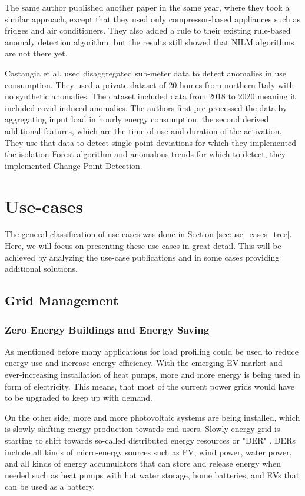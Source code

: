 The same author published another paper \cite{NILMAD22019} in the same year, where they took a similar approach, except that they used 
only compressor-based appliances such as fridges and air conditioners. They also added a rule to their existing rule-based anomaly 
detection algorithm, but the results still showed that NILM algorithms are not there yet. 

Castangia et al.\cite{Castangia2021} used disaggregated sub-meter data to detect anomalies in use consumption.
They used a private dataset of 20 homes from northern Italy with no synthetic anomalies. 
The dataset included data from 2018 to 2020 meaning it included covid-induced anomalies. 
The authors first pre-processed the data by aggregating input load in hourly energy consumption, 
the second derived additional features, which are the time of use and duration of the activation.
They use that data to detect single-point deviations for which they implemented the isolation Forest algorithm and
anomalous trends for which to detect, they implemented Change Point Detection. 

\section{Use-cases}
\label{sec:use-cases}

The general classification of use-cases was done in Section \ref{sec:use_cases_tree}. 
Here, we will focus on presenting these use-cases in great detail.
This will be achieved by analyzing the use-case publications and in some cases providing additional solutions.

\subsection{Grid Management}
\label{sec:grid_managment}
\subsubsection{Zero Energy Buildings and Energy Saving}

As mentioned before many applications for load profiling could be used to reduce energy use and increase energy efficiency. 
With the emerging EV-market and ever-increasing installation of heat pumps, more and more energy is being used in form of electricity. 
This means, that most of the current power grids would have to be upgraded to keep up with demand.

On the other side, more and more photovoltaic systems are being installed,
which is slowly shifting energy production towards end-users.
Slowly energy grid is starting to shift towards so-called distributed energy resources or "DER" \cite{MORENOJARAMILLO2021445}.
DERs include all kinds of micro-energy sources such as PV, wind power, water power, and all kinds of energy accumulators that can store 
and release energy when needed such as heat pumps with hot water storage, home batteries, and EVs that can be used as a battery.

